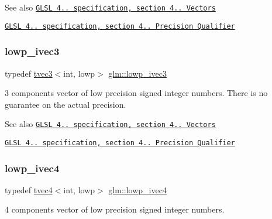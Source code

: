 \begin{DoxySeeAlso}{See also}
\href{http://www.opengl.org/registry/doc/GLSLangSpec.4.20.8.pdf}{\tt G\+L\+SL 4.. specification, section 4.. Vectors} 

\href{http://www.opengl.org/registry/doc/GLSLangSpec.4.20.8.pdf}{\tt G\+L\+SL 4.. specification, section 4.. Precision Qualifier} 
\end{DoxySeeAlso}
\mbox{\label{group__core__precision_gad03cd497aea76c671fda2ce1d697e905}} 
\subsubsection{\texorpdfstring{lowp\+\_\+ivec3}{lowp\_ivec3}}
{\footnotesize\ttfamily typedef \hyperlink{structglm_1_1tvec3}{tvec3}$<$int, lowp$>$ \hyperlink{group__core__precision_gad03cd497aea76c671fda2ce1d697e905}{glm\+::lowp\+\_\+ivec3}}

3 components vector of low precision signed integer numbers. There is no guarantee on the actual precision.

\begin{DoxySeeAlso}{See also}
\href{http://www.opengl.org/registry/doc/GLSLangSpec.4.20.8.pdf}{\tt G\+L\+SL 4.. specification, section 4.. Vectors} 

\href{http://www.opengl.org/registry/doc/GLSLangSpec.4.20.8.pdf}{\tt G\+L\+SL 4.. specification, section 4.. Precision Qualifier} 
\end{DoxySeeAlso}
\mbox{\label{group__core__precision_ga863ce958bb6c85ab934feeb4a0da5821}} 
\subsubsection{\texorpdfstring{lowp\+\_\+ivec4}{lowp\_ivec4}}
{\footnotesize\ttfamily typedef \hyperlink{structglm_1_1tvec4}{tvec4}$<$int, lowp$>$ \hyperlink{group__core__precision_ga863ce958bb6c85ab934feeb4a0da5821}{glm\+::lowp\+\_\+ivec4}}

4 components vector of low precision signed integer numbers.

